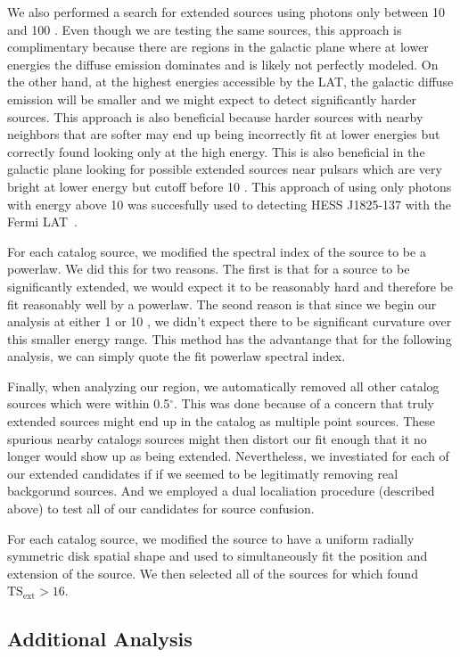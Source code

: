 \documentclass[preprint]{aastex}
\newcommand{\gev}{\text{GeV}\xspace}
\newcommand{\tsext}{{\ensuremath{\text{TS}_\text{ext}}}\xspace}
\renewcommand{\deg}{\ensuremath{^\circ}\xspace}
\newcommand{\pointlike}{\text{\em pointlike}\xspace}
\begin{document}
We also performed a search for extended sources using photons only between
10 \gev and 100 \gev. Even though we are testing the same sources, this
approach is complimentary because there are regions in the galactic
plane where at lower energies the diffuse emission dominates and is
likely not perfectly modeled. On the other hand, at the highest energies
accessible by the LAT, the galactic diffuse emission will be smaller and
we might expect to detect significantly harder sources. This approach is
also beneficial because harder sources with nearby neighbors that are
softer may end up being incorrectly fit at lower energies but correctly
found looking only at the high energy.  This is also beneficial in the
galactic plane looking for possible extended sources near pulsars which
are very bright at lower energy but cutoff before 10 \gev.  This approach
of using only photons with energy above 10 \gev was succesfully used to detecting
HESS J1825-137 with the Fermi LAT~\cite{fermi_hess_j1825}.

For each catalog source, we modified the spectral index of the source
to be a powerlaw. We did this for two reasons. The first is that for a
source to be significantly extended, we would expect it to be reasonably
hard and therefore be fit reasonably well by a powerlaw.  The seond reason
is that since we begin our analysis at either 1 \gev or 10 \gev, we didn't
expect there to be significant curvature over this smaller energy range.
This method has the advantange that for the following analysis, we can
simply quote the fit powerlaw spectral index.

Finally, when analyzing our region, we automatically removed all other
catalog sources which were within 0.5\deg. This was done because of
a concern that truly extended sources might end up in the catalog as
multiple point sources. These spurious nearby catalogs sources might then
distort our fit enough that it no longer would show up as being extended.
Nevertheless, we investiated for each of our extended candidates if
if we seemed to be legitimatly removing real backgorund sources. And
we employed a dual localiation procedure (described above) to test
all of our candidates for source confusion.

For each catalog source, we modified the source to have a uniform radially
symmetric disk spatial shape and used \pointlike to simultaneously fit
the position and extension of the source.  We then selected all of the
sources for which \pointlike found $\tsext>16$.

\subsection{Additional Analysis}
\end{document}
